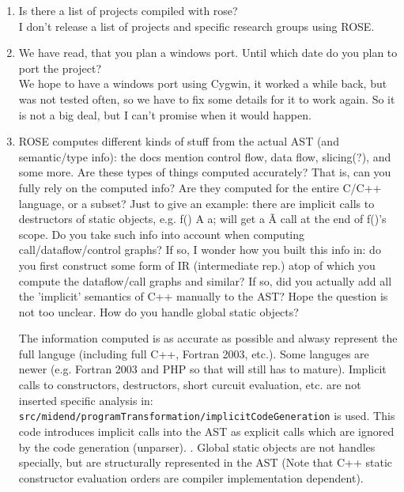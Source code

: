\begin{enumerate}
\item Is there a list of projects compiled with rose? \\
     I don't release a list of projects and specific research groups using ROSE.  

\item We have read, that you plan a windows port. Until which date do you plan to port the
      project? \\
   We hope to have a windows port using Cygwin, it worked
a while back, but was not tested often, so we have to fix some
details for it to work again.  So it is not a big deal, but I can't
promise when it would happen.

\item ROSE computes different kinds of stuff from the actual AST (and semantic/type info): 
      the docs mention control flow, data flow, slicing(?), and some more.
      Are these types of things computed accurately? That is, can you fully rely on the computed info?
      Are they computed for the entire C/C++ language, or a subset? Just to give an
      example: there are implicit calls to destructors of static objects, e.g. f() { A a; }
      will get a \~A call at the end of f()'s scope. Do you take such info into account when
      computing call/dataflow/control graphs? If so, I wonder how you built this info in: do
      you first construct some form of IR (intermediate rep.) atop of which you compute the
      dataflow/call graphs and similar? If so, did you actually add all the 'implicit'
      semantics of C++ manually to the AST? Hope the question is not too unclear.
      How do you handle global static objects?

   The information computed is as accurate as possible and alwasy represent the full
   languge (including full C++, Fortran 2003, etc.).  Some languges are newer
   (e.g. Fortran 2003 and PHP so that will still has to mature).  Implicit calls to
   constructors, destructors, short curcuit evaluation, etc. are not inserted specific analysis in:
   {\tt src/midend/programTransformation/implicitCodeGeneration} is used. This code introduces
   implicit calls into the AST as explicit calls which are ignored by the code generation
   (unparser). .
   Global static objects are not handles specially, but are structurally represented in
   the AST (Note that C++ static constructor evaluation orders are compiler implementation dependent).


\end{enumerate}

